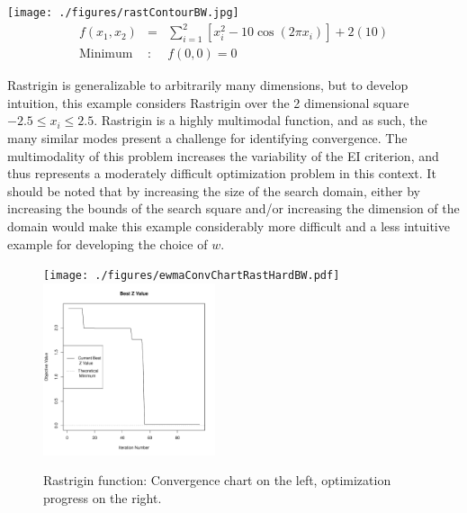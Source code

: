 \documentclass[12pt]{article}
\begin{document}
%
%
\begin{center}
        \texttt{[image: ./figures/rastContourBW.jpg]}
        \begin{eqnarray}
        f(x_1, x_2) &=& \sum_{i=1}^2\left[x_i^2-10\cos(2\pi x_i)\right] + 2(10)\\
        \label{rastEq}
        \text{Minimum}&:& f(0, 0)=0\nonumber
        \end{eqnarray}
\end{center}
%
%

%
Rastrigin is generalizable to arbitrarily many dimensions, but to develop intuition, this example considers Rastrigin over the 2 dimensional square $-2.5\le x_i\le 2.5$.
%
Rastrigin is a highly multimodal function, and as such, the many similar modes present a challenge for identifying convergence.
%
The multimodality of this problem increases the variability of the EI criterion, and thus represents a moderately difficult optimization problem in this context. 
%
It should be noted that by increasing the size of the search domain, either by increasing the bounds of the search square and/or increasing the dimension of the domain would make this example considerably more difficult and a less intuitive example for developing the choice of $w$. %

%
%
\begin{figure}[!htb]
        \centering
        \texttt{[image: ./figures/ewmaConvChartRastHardBW.pdf]}
        \includegraphics[width=0.45\textwidth]{./figures/bestZRastHardEnd.pdf}
        \caption{Rastrigin function: Convergence chart on the left, optimization progress on the right.}
        \label{fig:rastrigin}
\end{figure}
%
%
\end{document}
